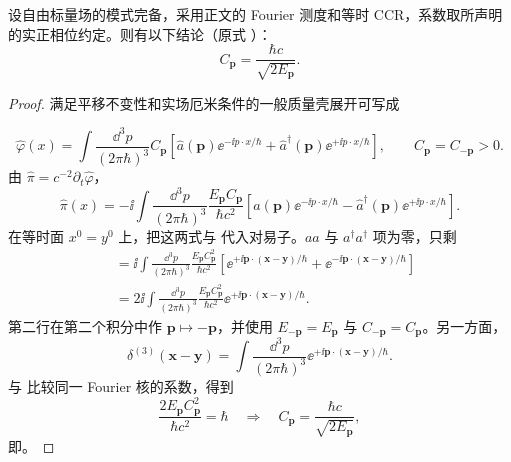 \begin{proposition}[模式系数的正则归一化]
设自由标量场的模式完备，采用正文的 Fourier 测度和等时 CCR，系数取所声明的实正相位约定。则有以下结论（原式 ）：
\begin{equation*}
 C_{\mathbf p}=\frac{\hbar c}{\sqrt{2E_{\mathbf p}}}.
\end{equation*}
\end{proposition}
\begin{proof}
满足平移不变性和实场厄米条件的一般质量壳展开可写成

\begin{equation*}
 \hat\varphi(x)=
 \int\frac{\dd^3 p}{(2\pi\hbar)^3}C_{\mathbf p}
 \left[
 \hat a(\mathbf p)\ee^{-\ii p\cdot x/\hbar}
 +\hat a^\dagger(\mathbf p)\ee^{+\ii p\cdot x/\hbar}
 \right],
 \qquad C_{\mathbf p}=C_{-\mathbf p}>0.
\end{equation*}
由 $\hat\pi=c^{-2}\partial_t\hat\varphi$，
\begin{equation*}
 \hat\pi(x)=
 -\ii\int\frac{\dd^3 p}{(2\pi\hbar)^3}
 \frac{E_{\mathbf p}C_{\mathbf p}}{\hbar c^2}
 \left[
 \hat a(\mathbf p)\ee^{-\ii p\cdot x/\hbar}
 -\hat a^\dagger(\mathbf p)\ee^{+\ii p\cdot x/\hbar}
 \right].
\end{equation*}
在等时面 $x^0=y^0$ 上，把这两式与  代入对易子。$aa$ 与 $a^\dagger a^\dagger$ 项为零，只剩
\begin{align*}
 [\hat\varphi(\mathbf x,t),\hat\pi(\mathbf y,t)]
 &=\ii\int\frac{\dd^3 p}{(2\pi\hbar)^3}
 \frac{E_{\mathbf p}C_{\mathbf p}^{2}}{\hbar c^2}
 \left[
 \ee^{+\ii\mathbf p\cdot(\mathbf x-\mathbf y)/\hbar}
 +\ee^{-\ii\mathbf p\cdot(\mathbf x-\mathbf y)/\hbar}
 \right]\\
 &=2\ii\int\frac{\dd^3 p}{(2\pi\hbar)^3}
 \frac{E_{\mathbf p}C_{\mathbf p}^{2}}{\hbar c^2}
 \ee^{+\ii\mathbf p\cdot(\mathbf x-\mathbf y)/\hbar}.
\end{align*}
第二行在第二个积分中作 $\mathbf p\mapsto-\mathbf p$，并使用 $E_{-\mathbf p}=E_{\mathbf p}$ 与 $C_{-\mathbf p}=C_{\mathbf p}$。另一方面，
\begin{equation*}
 \delta^{(3)}(\mathbf x-\mathbf y)
 =\int\frac{\dd^3 p}{(2\pi\hbar)^3}
 \ee^{+\ii\mathbf p\cdot(\mathbf x-\mathbf y)/\hbar}.
\end{equation*}
与  比较同一 Fourier 核的系数，得到
\begin{equation*}
 \frac{2E_{\mathbf p}C_{\mathbf p}^{2}}{\hbar c^2}=\hbar
 \quad\Longrightarrow\quad
 C_{\mathbf p}=\frac{\hbar c}{\sqrt{2E_{\mathbf p}}},
\end{equation*}
即。
\end{proof}

